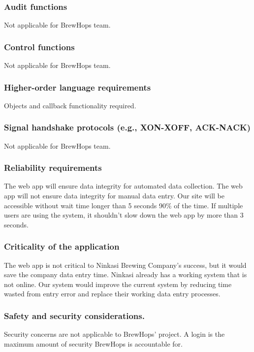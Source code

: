 \documentclass[draftclsnofoot,onecolumn,letterpaper,10pt,compsoc]{IEEEtran}
\begin{document}
		\subsubsection{Audit functions}
        Not applicable for BrewHops team.

		\subsubsection{Control functions}
        Not applicable for BrewHops team.

		\subsubsection{Higher-order language requirements}
        Objects and callback functionality required.

		\subsubsection{Signal handshake protocols (e.g., XON-XOFF, ACK-NACK)}
        Not applicable for BrewHops team.

		\subsubsection{Reliability requirements}
		The web app will ensure data integrity for automated data collection.
		The web app will not ensure data integrity for manual data entry.
		Our site will be accessible without wait time longer than 5 seconds 90\% of the time.
		If multiple users are using the system, it shouldn’t slow down the web app by more than 3 seconds.


		\subsubsection{Criticality of the application}
		The web app is not critical to Ninkasi Brewing Company’s success, but it would save the company data entry time.
		Ninkasi already has a working system that is not online.
		Our system would improve the current system by reducing time wasted from entry error and replace their working data entry processes.


		\subsubsection{Safety and security considerations.}
		Security concerns are not applicable to BrewHops’ project. A login is the maximum amount of security BrewHops is accountable for.
\end{document}
